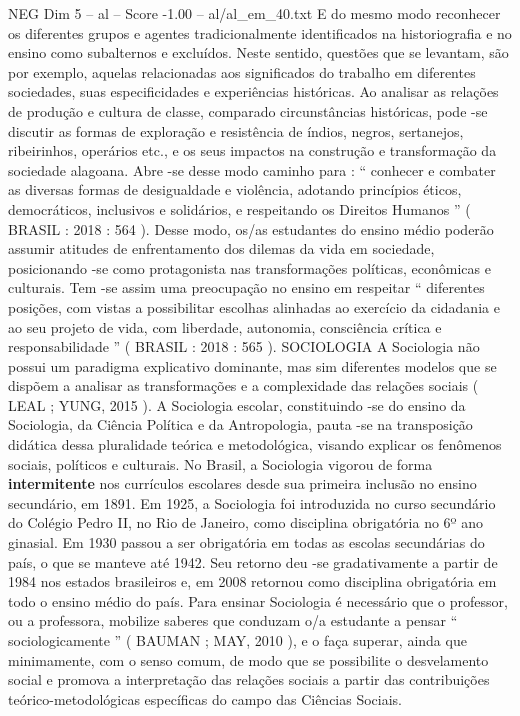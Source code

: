 \begin{textsample}{NEG Dim 5 – al – Score -1.00 – al/al\_em\_40.txt}
E do mesmo modo reconhecer os diferentes grupos e agentes tradicionalmente identificados na historiografia e no ensino como subalternos e excluídos.
Neste sentido, questões que se levantam, são por exemplo, aquelas relacionadas aos significados do trabalho em diferentes sociedades, suas especificidades e experiências históricas.
Ao analisar as relações de produção e cultura de classe, comparado circunstâncias históricas, pode -se discutir as formas de exploração e resistência de índios, negros, sertanejos, ribeirinhos, operários etc., e os seus impactos na construção e transformação da sociedade alagoana.
Abre -se desse modo caminho para : “ conhecer e combater as diversas formas de desigualdade e violência, adotando princípios éticos, democráticos, inclusivos e solidários, e respeitando os Direitos Humanos ” ( BRASIL : 2018 : 564 ).
Desse modo, os/as estudantes do ensino médio poderão assumir atitudes de enfrentamento dos dilemas da vida em sociedade, posicionando -se como protagonista nas transformações políticas, econômicas e culturais.
Tem -se assim uma preocupação no ensino em respeitar “ diferentes posições, com vistas a possibilitar escolhas alinhadas ao exercício da cidadania e ao seu projeto de vida, com liberdade, autonomia, consciência crítica e responsabilidade ” ( BRASIL : 2018 : 565 ).
SOCIOLOGIA A Sociologia não possui um paradigma explicativo dominante, mas sim diferentes modelos que se dispõem a analisar as transformações e a complexidade das relações sociais ( LEAL ; YUNG, 2015 ).
A Sociologia escolar, constituindo -se do ensino da Sociologia, da Ciência Política e da Antropologia, pauta -se na transposição didática dessa pluralidade teórica e metodológica, visando explicar os fenômenos sociais, políticos e culturais.
No Brasil, a Sociologia vigorou de forma \textbf{intermitente} nos currículos escolares desde sua primeira inclusão no ensino secundário, em 1891.
Em 1925, a Sociologia foi introduzida no curso secundário do Colégio Pedro II, no Rio de Janeiro, como disciplina obrigatória no 6º ano ginasial.
Em 1930 passou a ser obrigatória em todas as escolas secundárias do país, o que se manteve até 1942.
Seu retorno deu -se gradativamente a partir de 1984 nos estados brasileiros e, em 2008 retornou como disciplina obrigatória em todo o ensino médio do país.
Para ensinar Sociologia é necessário que o professor, ou a professora, mobilize saberes que conduzam o/a estudante a pensar “ sociologicamente ” ( BAUMAN ; MAY, 2010 ), e o faça superar, ainda que minimamente, com o senso comum, de modo que se possibilite o desvelamento social e promova a interpretação das relações sociais a partir das contribuições teórico-metodológicas específicas do campo das Ciências Sociais.

\end{textsample}
